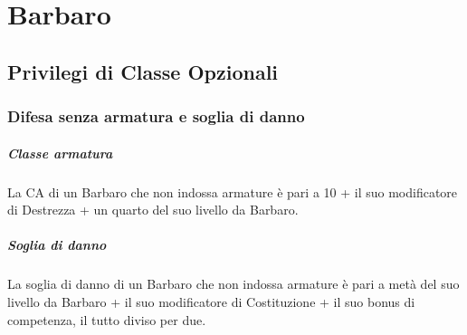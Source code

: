 \chapter{Barbaro}

\section{Privilegi di Classe Opzionali}

\subsection{Difesa senza armatura e soglia di danno}
\paragraph{Classe armatura}La CA di un Barbaro che non indossa armature è pari a 10 + il suo modificatore di Destrezza + un quarto del suo livello da Barbaro. 
\paragraph{Soglia di danno}La soglia di danno di un Barbaro che non indossa armature è pari a metà del suo livello da Barbaro + il suo modificatore di Costituzione + il suo bonus di competenza, il tutto diviso per due.